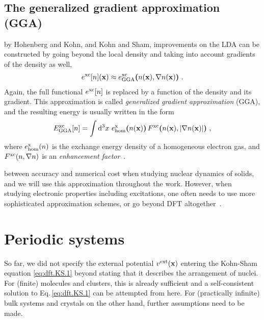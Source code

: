 \subsection{The generalized gradient approximation (GGA)}
 by Hohenberg and Kohn, and Kohn and Sham, improvements on the LDA can be constructed by going beyond the local density and taking into account gradients of the density as well,
\begin{align}
	e^{\rm xc} [n] ({\bf x})
		\approx e^{\rm xc}_{\rm GGA} \bm ( n({\bf x}), \nabla n({\bf x}) \bm )~.
	\label{eq:dft.exc.gga.1}
\end{align}
Again, the full functional $e^{\rm xc}[n]$ is replaced by a function of the density and its gradient. This approximation is called \emph{generalized gradient approximation} (GGA), and the resulting energy is usually written in the form
\begin{align}
		E^{\rm xc}_{\rm GGA}[n] 
		= \int \d^3 x ~ e^{\rm x}_{\rm hom} \bm( n ({\bf x}) \bm) \,
			F^{\rm xc} \bm( n ({\bf x}), \lvert \nabla n ({\bf x})\rvert \bm)~,
		\label{eq:dft.GGA.1}
\end{align}
where $e^{\rm x}_{\rm hom}(n)$ is the exchange energy density of a homogeneous electron gas, and $F^{\rm xc}(n, \nabla n)$ is an \emph{enhancement factor}~\cite{Perdew.1992}.

 between accuracy and numerical cost when studying nuclear dynamics of solids, and we will use this approximation throughout the work. However, when studying electronic properties including excitations, one often needs to use more sophisticated approximation schemes, or go beyond DFT altogether~\cite{Cohen.2008,Cohen.2012}.



\section{Periodic systems}
\label{sec:theory.periodic.1}
So far, we did not specify the external potential $v^{\rm ext} ({\bf x})$ entering the Kohn-Sham equation \eqref{eq:dft.KS.1} beyond stating that it describes the arrangement of nuclei. For (finite) molecules and clusters, this is already sufficient and a self-consistent solution to Eq.\,\eqref{eq:dft.KS.1} can be attempted from here. For (practically infinite) bulk systems and crystals on the other hand, further assumptions need to be made.

